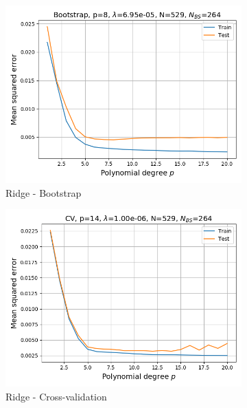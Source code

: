 \documentclass[a4paper]{article}
\begin{document}
\begin{figure}[H]
\begin{subfigure}{0.49\textwidth}
    \includegraphics[scale=0.45]{../figures/task_d/MSE_train_test_Bootstrap_N529_pmax20_nlamb20_noise0.05_seed4155_Ridge_boot_Nbs264_opt1.png}
    \caption{Ridge - Bootstrap}
  \end{subfigure}
  \begin{subfigure}{0.49\textwidth}
    \includegraphics[scale=0.45]{../figures/task_d/MSE_train_test_CV_N529_pmax20_nlamb20_noise0.05_seed4155_Ridge_cv_k5_opt1.png}
    \caption{Ridge - Cross-validation}
  \end{subfigure}\\
  \begin{subfigure}{0.49\textwidth}

\end{subfigure}
\end{figure}
\end{document}
